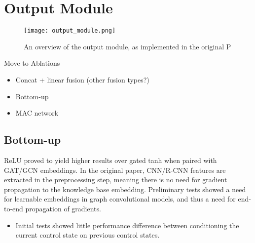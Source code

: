 \section{Output Module}
\label{section:output_module}

\begin{figure}[htbp]
    \centering
    \texttt{[image: output\_module.png]}
    \caption{An overview of the output module, as implemented in the original P}
    \label{fig:output_module}
\end{figure}

{\color{red}

Move to Ablations

\begin{itemize}
  \item Concat + linear fusion (other fusion types?)
  \item Bottom-up
  \item MAC network
\end{itemize}

\subsection{Bottom-up}
\label{subsection:bottom_up}
 ReLU proved to yield higher results over gated tanh when paired with GAT/GCN embeddings. In the original paper, CNN/R-CNN features are extracted in the preprocessing step, meaning there is no need for gradient propagation to the knowledge base embedding. Preliminary tests showed a need for learnable embeddings in graph convolutional models, and thus a need for end-to-end propagation of gradients.}



\begin{itemize}
  \item Initial tests showed little performance difference between conditioning the current control state on previous control states. %
\end{itemize}
